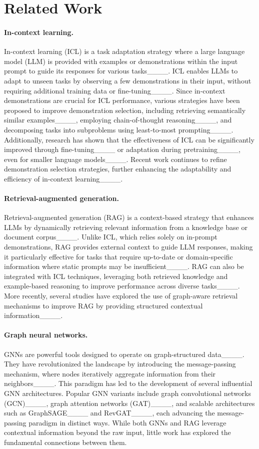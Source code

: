 \section{Related Work}
\paragraph{In-context learning.}
In-context learning (ICL) is a task adaptation strategy where a large language model (LLM) is provided with examples or demonstrations within the input prompt to guide its responses for various tasks____. ICL enables LLMs to adapt to unseen tasks by observing a few demonstrations in their input, without requiring additional training data or fine-tuning____.
Since in-context demonstrations are crucial for ICL performance, various strategies have been proposed to improve demonstration selection, including retrieving semantically similar examples____, employing chain-of-thought reasoning____, and decomposing tasks into subproblems using least-to-most prompting____. Additionally, research has shown that the effectiveness of ICL can be significantly improved through fine-tuning____ or adaptation during pretraining____, even for smaller language models____. Recent work continues to refine demonstration selection strategies, further enhancing the adaptability and efficiency of in-context learning____.


\paragraph{Retrieval-augmented generation.}
Retrieval-augmented generation (RAG) is a context-based strategy that enhances LLMs by dynamically retrieving relevant information from a knowledge base or document corpus____. Unlike ICL, which relies solely on in-prompt demonstrations, RAG provides external context to guide LLM responses, making it particularly effective for tasks that require up-to-date or domain-specific information where static prompts may be insufficient____.
RAG can also be integrated with ICL techniques, leveraging both retrieved knowledge and example-based reasoning to improve performance across diverse tasks____. More recently, several studies have explored the use of graph-aware retrieval mechanisms to improve RAG by providing structured contextual information____.



\paragraph{Graph neural networks.}
GNNs are powerful tools designed to operate on graph-structured data____.
They have revolutionized the landscape by introducing the message-passing mechanism, where nodes iteratively aggregate information from their neighbors____.
This paradigm has led to the development of several influential GNN architectures.
Popular GNN variants include graph convolutional networks (GCN)____, graph attention networks (GAT)____, and scalable architectures such as GraphSAGE____ and RevGAT____, each advancing the message-passing paradigm in distinct ways.
While both GNNs and RAG leverage contextual information beyond the raw input, little work has explored the fundamental connections between them.